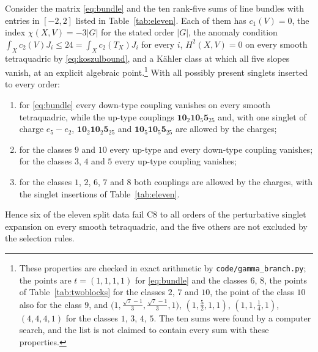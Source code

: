 \begin{proposition}\label{prop:eleven}
Consider the matrix \eqref{eq:bundle} and the ten rank-five sums of line
bundles with entries in $[-2,2]$ listed in Table~\ref{tab:eleven}. Each
of them has $c_1(V)=0$, the index $\chi(X,V)=-3|G|$ for the stated order
$|G|$, the anomaly condition $\int_Xc_2(V)J_i\le24=\int_Xc_2(T_X)J_i$ for
every $i$, $H^2(X,V)=0$ on every smooth tetraquadric by
\eqref{eq:koszulbound}, and a K\"ahler class at which all five slopes
vanish, at an explicit algebraic point.\footnote{These properties are
checked in exact arithmetic by \texttt{code/gamma\_branch.py}; the points
are $t=(1,1,1,1)$ for \eqref{eq:bundle} and the classes $6$, $8$, the points
of Table~\ref{tab:twoblocks} for the classes $2$, $7$ and $10$, the point of
the class $10$ also for the class $9$, and
$\bigl(1,\tfrac{\sqrt7-1}3,\tfrac{\sqrt7-1}3,1\bigr)$, $(1,\tfrac52,1,1)$,
$(1,1,\tfrac14,1)$, $(4,4,4,1)$ for the classes $1$, $3$, $4$, $5$. The
ten sums were found by a computer search, and the list is not claimed to
contain every sum with these properties.} With all possibly present singlets
inserted to every order:
\begin{enumerate}[label=\textup{(\roman*)},leftmargin=*,itemsep=1pt]
\item for \eqref{eq:bundle} every down-type coupling vanishes on every
smooth tetraquadric, while the up-type couplings
$\mathbf{10}_2\mathbf{10}_5\mathbf 5_{25}$ and, with one singlet of charge
$e_5-e_2$, $\mathbf{10}_2\mathbf{10}_2\mathbf 5_{25}$ and
$\mathbf{10}_5\mathbf{10}_5\mathbf 5_{25}$ are allowed by the charges;
\item for the classes $9$ and $10$ every up-type and every down-type
coupling vanishes; for the classes $3$, $4$ and $5$ every up-type coupling
vanishes;
\item for the classes $1$, $2$, $6$, $7$ and $8$ both couplings are
allowed by the charges, with the singlet insertions of
Table~\ref{tab:eleven}.
\end{enumerate}
Hence six of the eleven split data fail C8 to all orders of the
perturbative singlet expansion on every smooth tetraquadric, and the five
others are not excluded by the selection rules.
\end{proposition}


